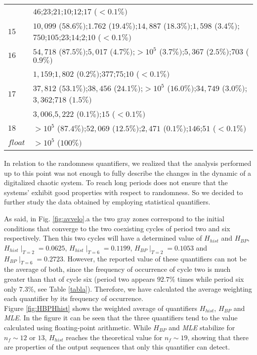 \begin{table}[!t]
\begin{tabular}{l  l  }
& $46$;$23$;$21$;$10$;$12$;$17$ {\scriptsize($<0.1\%  )$}\\ 
$15$ & $10,099$ {\scriptsize($58.6 \%)$};$1.762$ {\scriptsize($19.4 \%)$};$14,887$ {\scriptsize($18.3\%)$};$1,598$ {\scriptsize($3.4\%)$};$750$;$105$;$23$;$14$;$2$;$10$ {\scriptsize($<0.1\%)$}\\
$16$ & $54,718$ {\scriptsize($87.5\% )$};$5,017$ {\scriptsize($4.7\% )$};$>10^5$ {\scriptsize($3.7\% )$};$5,367$ {\scriptsize($2.5\% )$};$703$ {\scriptsize($0.9\% )$}\\
& $1,159$;$1,802$ {\scriptsize($0.2\% )$};$377$;$75$;$10$ {\scriptsize($<0.1\%  )$}\\  
$17$ & $37,812$ {\scriptsize($53.1\% )$};$38,456$ {\scriptsize($24.1\% )$};$>10^5$ {\scriptsize($16.0\%)$};$34,749$ {\scriptsize($3.0\% )$};$3,362$;$718$ {\scriptsize($1.5\%)$}\\
& $3,006$,$5,222$ {\scriptsize($0.1\% )$};$15$ {\scriptsize($<0.1 \%)$}\\  
$18$ & $>10^5$ {\scriptsize($87.4\%)$};$52,069$ {\scriptsize($12.5\% )$};$2,471$ {\scriptsize($0.1\% )$};$146$;$51$ {\scriptsize($<0.1 \%)$}\\
$float$ & $>10^5$ {\scriptsize($100\% )$}\\
\hline

\end{tabular}

\end{table}
\normalsize

In relation to the randomness quantifiers, we realized that the analysis performed up to this point was not
enough to fully describe the changes in the dynamic of a digitalized chaotic system. To reach long periods does not ensure that the systems' exhibit good properties with respect to randomness. So we decided to further study the data obtained by employing statistical quantifiers.

As said, in Fig. \ref{fig:avvelo}.a the two gray zones correspond to the initial conditions that converge to the two coexisting cycles of period two and six respectively. Then this two cycles will have a determined value of $H_{hist}$ and $H_{BP}$, $H_{hist}\mid_{T=2}=0.0625$, $H_{hist}\mid_{T=6}=0.1199$, $H_{BP}\mid_{T=2}=0.1053$ and $H_{BP}\mid_{T=6}=0.2723$. However, the reported value of these quantifiers can not be the average of both, since the frequency of occurrence of cycle two is much greater than that of cycle six (period two appears $92.7\%$ times while period six only $7.3\%$, see Table \ref{tabla}). Therefore, we have calculated the average weighting each quantifier by its frequency of occurrence.\\
Figure \ref{fig:HBPHhist} shows the weighted average of quantifiers $H_{hist}$, $H_{BP}$ and \textsl{MLE}. In the figure it can be seen that the three quantifiers tend to the value calculated using floating-point arithmetic. While $H_{BP}$ and \textsl{MLE} stabilize for $n_f \sim 12$ or $13$, $H_{hist}$ reaches the theoretical value for $n_f \sim 19$, showing that there are properties of the output sequences that only this quantifier can detect.


